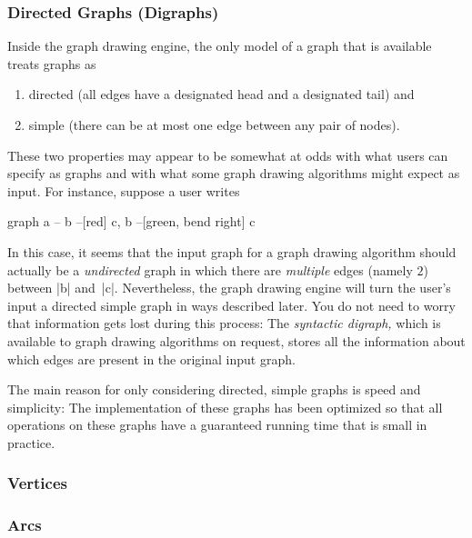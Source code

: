 \subsubsection{Directed Graphs (Digraphs)}

Inside the graph drawing engine, the only model of a graph that is 
available treats graphs as
\begin{enumerate}
\item directed (all edges have a designated head and a designated
  tail) and
\item simple (there can be at most one edge between any pair of
  nodes). 
\end{enumerate}
These two properties may appear to be somewhat at odds with what users
can specify as graphs and with what some graph drawing algorithms
might expect as input. For instance, suppose a user writes
\begin{codeexample}
graph { a -- b --[red] c, b --[green, bend right] c }
\end{codeexample}
In this case, it seems that the input graph for a graph drawing
algorithm should actually be a \emph{undirected} graph in which there
are \emph{multiple} edges (namely $2$) between |b| and~|c|.
Nevertheless, the graph drawing engine will turn the user's input a
directed simple graph in ways described later. You do not need to
worry that information gets lost during this process: The
\emph{syntactic digraph,} which is available to graph drawing
algorithms on request, stores all the information about which edges
are present in the original input graph.

The main reason for only considering directed, simple graphs is speed
and simplicity: The implementation of these graphs has been optimized so
that all operations on these graphs have a guaranteed running time
that is small in practice. 


\subsubsection{Vertices}


\subsubsection{Arcs}
\label{section-gd-arc-model}


